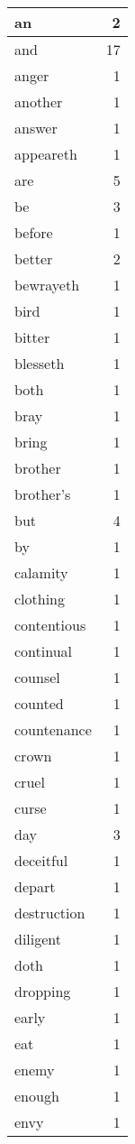 \begin{center}
\begin{longtable}{l|r}
an & 2\\ \hline 
and & 17\\ \hline 
anger & 1\\ \hline 
another & 1\\ \hline 
answer & 1\\ \hline 
appeareth & 1\\ \hline 
are & 5\\ \hline 
be & 3\\ \hline 
before & 1\\ \hline 
better & 2\\ \hline 
bewrayeth & 1\\ \hline 
bird & 1\\ \hline 
bitter & 1\\ \hline 
blesseth & 1\\ \hline 
both & 1\\ \hline 
bray & 1\\ \hline 
bring & 1\\ \hline 
brother & 1\\ \hline 
brother's & 1\\ \hline 
but & 4\\ \hline 
by & 1\\ \hline 
calamity & 1\\ \hline 
clothing & 1\\ \hline 
contentious & 1\\ \hline 
continual & 1\\ \hline 
counsel & 1\\ \hline 
counted & 1\\ \hline 
countenance & 1\\ \hline 
crown & 1\\ \hline 
cruel & 1\\ \hline 
curse & 1\\ \hline 
day & 3\\ \hline 
deceitful & 1\\ \hline 
depart & 1\\ \hline 
destruction & 1\\ \hline 
diligent & 1\\ \hline 
doth & 1\\ \hline 
dropping & 1\\ \hline 
early & 1\\ \hline 
eat & 1\\ \hline 
enemy & 1\\ \hline 
enough & 1\\ \hline 
envy & 1\\ \hline 

\end{longtable}
\end{center}
